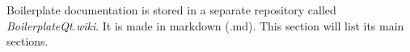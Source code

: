 Boilerplate documentation is stored in a separate repository called \textit{BoilerplateQt.wiki}. It is made in markdown (.md). This section will list its main sections.
  {\parindent0pt
    
    
    
    
    
    
  }
